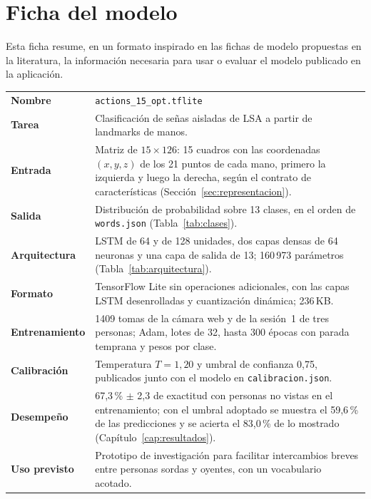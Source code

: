\chapter{Ficha del modelo}
\label{ap:ficha-modelo}

Esta ficha resume, en un formato inspirado en las fichas de modelo propuestas en la literatura, la información necesaria para usar o evaluar el modelo publicado en la aplicación.

\begin{table}[h]
    \centering
    \small
    \begin{tabular}{p{4cm}p{10cm}}
        \toprule
        \textbf{Nombre} & \texttt{actions\_15\_opt.tflite} \\
        \textbf{Tarea} & Clasificación de señas aisladas de LSA a partir de landmarks de manos. \\
        \textbf{Entrada} & Matriz de $15 \times 126$: 15 cuadros con las coordenadas $(x, y, z)$ de los 21 puntos de cada mano, primero la izquierda y luego la derecha, según el contrato de características (Sección~\ref{sec:representacion}). \\
        \textbf{Salida} & Distribución de probabilidad sobre 13 clases, en el orden de \texttt{words.json} (Tabla~\ref{tab:clases}). \\
        \textbf{Arquitectura} & LSTM de 64 y de 128 unidades, dos capas densas de 64 neuronas y una capa de salida de 13; 160\,973 parámetros (Tabla~\ref{tab:arquitectura}). \\
        \textbf{Formato} & TensorFlow Lite sin operaciones adicionales, con las capas LSTM desenrolladas y cuantización dinámica; 236\,KB. \\
        \textbf{Entrenamiento} & 1409 tomas de la cámara web y de la sesión~1 de tres personas; Adam, lotes de 32, hasta 300 épocas con parada temprana y pesos por clase. \\
        \textbf{Calibración} & Temperatura $T = 1{,}20$ y umbral de confianza 0,75, publicados junto con el modelo en \texttt{calibracion.json}. \\
        \textbf{Desempeño} & 67,3\,\% $\pm$ 2,3 de exactitud con personas no vistas en el entrenamiento; con el umbral adoptado se muestra el 59,6\,\% de las predicciones y se acierta el 83,0\,\% de lo mostrado (Capítulo~\ref{cap:resultados}). \\
        \textbf{Uso previsto} & Prototipo de investigación para facilitar intercambios breves entre personas sordas y oyentes, con un vocabulario acotado. \\

\end{tabular}
\end{table}
